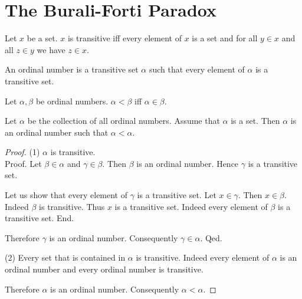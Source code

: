 \documentclass{article}
\begin{document}
  \section*{The Burali-Forti Paradox}

  \begin{forthel}
    \begin{definition}
      Let $x$ be a set.
      $x$ is transitive iff every element of $x$ is a set and for all $y \in x$
      and all $z \in y$ we have $z \in x$.
    \end{definition}

    \begin{definition}
      An ordinal number is a transitive set $\alpha$ such that every element of
      $\alpha$ is a transitive set.
    \end{definition}

    \begin{definition}
      Let $\alpha, \beta$ be ordinal numbers.
      $\alpha < \beta$ iff $\alpha \in \beta$.
    \end{definition}

    \begin{theorem}
      Let $\alpha$ be the collection of all ordinal numbers.
      Assume that $\alpha$ is a set.
      Then $\alpha$ is an ordinal number such that $\alpha < \alpha$.
    \end{theorem}
    \begin{proof}
      (1) $\alpha$ is transitive. \\
      Proof.
        Let $\beta \in \alpha$ and $\gamma \in \beta$.
        Then $\beta$ is an ordinal number.
        Hence $\gamma$ is a transitive set.

        Let us show that every element of $\gamma$ is a transitive set.
          Let $x \in \gamma$.
          Then $x \in \beta$.
          Indeed $\beta$ is transitive.
          Thus $x$ is a transitive set.
          Indeed every element of $\beta$ is a transitive set.
        End.

        Therefore $\gamma$ is an ordinal number.
        Consequently $\gamma \in \alpha$.
      Qed.

      (2) Every set that is contained in $\alpha$ is transitive.
      Indeed every element of $\alpha$ is an ordinal number and every ordinal
      number is transitive.

      Therefore $\alpha$ is an ordinal number.
      Consequently $\alpha < \alpha$.
    \end{proof}
  \end{forthel}
\end{document}
